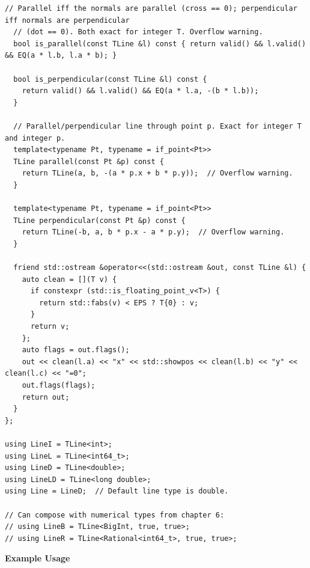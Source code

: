 \begin{lstlisting}[style=cpp]
  // Parallel iff the normals are parallel (cross == 0); perpendicular iff normals are perpendicular
  // (dot == 0). Both exact for integer T. Overflow warning.
  bool is_parallel(const TLine &l) const { return valid() && l.valid() && EQ(a * l.b, l.a * b); }

  bool is_perpendicular(const TLine &l) const {
    return valid() && l.valid() && EQ(a * l.a, -(b * l.b));
  }

  // Parallel/perpendicular line through point p. Exact for integer T and integer p.
  template<typename Pt, typename = if_point<Pt>>
  TLine parallel(const Pt &p) const {
    return TLine(a, b, -(a * p.x + b * p.y));  // Overflow warning.
  }

  template<typename Pt, typename = if_point<Pt>>
  TLine perpendicular(const Pt &p) const {
    return TLine(-b, a, b * p.x - a * p.y);  // Overflow warning.
  }

  friend std::ostream &operator<<(std::ostream &out, const TLine &l) {
    auto clean = [](T v) {
      if constexpr (std::is_floating_point_v<T>) {
        return std::fabs(v) < EPS ? T{0} : v;
      }
      return v;
    };
    auto flags = out.flags();
    out << clean(l.a) << "x" << std::showpos << clean(l.b) << "y" << clean(l.c) << "=0";
    out.flags(flags);
    return out;
  }
};

using LineI = TLine<int>;
using LineL = TLine<int64_t>;
using LineD = TLine<double>;
using LineLD = TLine<long double>;
using Line = LineD;  // Default line type is double.

// Can compose with numerical types from chapter 6:
// using LineB = TLine<BigInt, true, true>;
// using LineR = TLine<Rational<int64_t>, true, true>;
\end{lstlisting}
\textbf{Example Usage}\par
